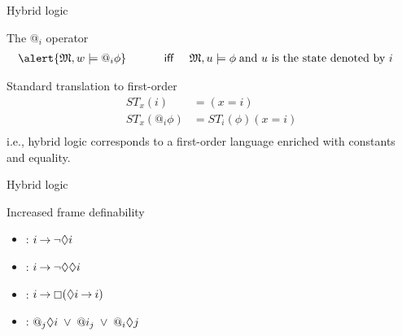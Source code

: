 \documentclass{beamer}
\begin{document}
\begin{slide}{Hybrid logic}\label{s:48}
\small

\begin{block}{The $@_i$ operator}
\begin{align*}
\alert{\ger{M}, w \models  @_i \phi}
  &&  \text{~~~~~~ \textsf{iff} ~~~}  &\ger{M}, u  \models \phi\; \text{and $u$ is the state denoted by $i$}
\end{align*}
\end{block}

\begin{block}{Standard translation to first-order}
\begin{align*}
ST_x(i) & =  (x = i)\\
ST_x(@_i \phi) & =  ST_i(\phi)(x = i)\\
\end{align*}
i.e., hybrid logic corresponds to a first-order language enriched with constants and equality.
\end{block}
\end{slide}




\begin{slide}{Hybrid logic}\label{s:49}
\small

\begin{block}{Increased frame definability}
\begin{itemize}
\item {}: $i \mathbin{\rightarrow} \neg \Diamond i$\\
\item {}: $i \mathbin{\rightarrow} \neg \Diamond \Diamond i$\\
\item {}: $i \mathbin{\rightarrow} \boxempty (\Diamond i \mathbin{\rightarrow} i)$\\
\item {}: $@_j \Diamond i\; \mathbin{\vee}\; @i_j    \; \mathbin{\vee}\;   @_i \Diamond j$
\end{itemize}
\end{block}

\end{slide}
\end{document}
